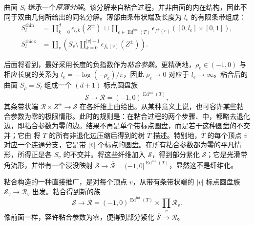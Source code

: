 \begin{note}\label{st:9.1}
曲面 $S_l$ 继承一个\emph{厚薄分解}。该分解来自粘合过程，并非曲面的内在结构，因此不同于双曲几何所给出的同名分解。薄部由条带状端及长度为 $l_e$ 的有限条带组成：
\[
\begin{aligned}
S_l^{\mathrm{thin}}&=\coprod_{k=0}^d\epsilon_{l,k}(Z^\pm)\ \sqcup\!
\coprod_{e\in\operatorname{Ed}^{\mathrm{int}}(T)}\epsilon_{f^+(e)}([0,l_e]\times[0,1]),\\
S_l^{\mathrm{thick}}&=\coprod_v\left(S_v\setminus\coprod_{k=0}^{|v|-1}\epsilon_{f_k(v)}(Z^\pm)\right).
\end{aligned}
\]

\end{note}
后面将看到，最好采用长度的负指数作为\emph{粘合参数}。更精确地，$\rho_e\in(-1,0)$ 与相应长度的关系为 $l_e=-\log(-\rho_e)/\pi$，因此 $\rho_e\to0$ 对应于 $l_e\to\infty$。粘合后的曲面 $S_\rho=S_l$ 组成一个 $(d+1)$ 标点圆盘族
\[
\mathcal S\longrightarrow\mathcal R=(-1,0)^{\operatorname{Ed}^{\mathrm{int}}(T)},
\]
其条带状端 $\mathcal R\times Z^\pm\to\mathcal S$ 在各纤维上由给出。从某种意义上说，也可容许某些粘合参数为零的极限情形。此时的规则是：在粘合过程的两个步骤、中，都略去退化边，即粘合参数为零的边。结果不再是单个带标点圆盘，而是若干这种圆盘的不交并；它由
将 $T$ 的所有非退化边压缩后得到的树 $\overline T$ 描述。特别地，$\overline T$ 的每个顶点 $\overline v$ 对应一个连通分支，它是带 $|\overline v|$ 个标点的圆盘。在所有粘合参数都为零的平凡情形，所得正是各 $S_v$ 的不交并。将这些纤维加入 $\mathcal S$，得到部分紧化 $\overline{\mathcal S}$；它是光滑带角流形，并带有一个浸没映射 $\overline{\mathcal S}\to\overline{\mathcal R}=(-1,0]^{\operatorname{Ed}^{\mathrm{int}}(T)}$，显然这不是纤维化。

粘合构造的一种直接推广，是对每个顶点 $v$，从带有条带状端的 $|v|$ 标点圆盘族 $\mathcal S_v\to\mathcal R_v$ 出发。粘合得到新的族
\[
\mathcal S\longrightarrow\mathcal R=(-1,0)^{\operatorname{Ed}^{\mathrm{int}}(T)}\times\prod_v\mathcal R_v.
\]
像前面一样，容许粘合参数为零，便得到部分紧化 $\overline{\mathcal S}\to\overline{\mathcal R}$。

